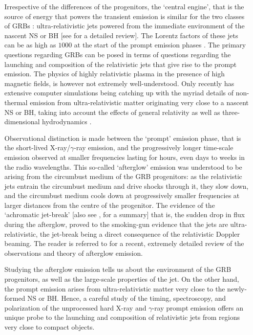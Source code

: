 Irrespective of the differences of the progenitors, the `central engine', that is the source of energy that powers the transient emission is similar for the two classes of GRBs \citep{Ghirlanda_et_al.-2009-A&A, Calderone_et_al.-2015-MNRAS}: ultra-relativistic jets powered from the immediate environment of the nascent NS or BH [see \cite{Kumar_and_Zhang-2015-PhR} for a detailed review]. The Lorentz factors of these jets can be as high as $1000$ at the start of the prompt emission phases \citep{Abdo_et_al.-2009-Science}. The primary questions regarding GRBs can be posed in terms of questions regarding the launching and composition of the relativistic jets that give rise to the prompt emission. The physics of highly relativistic plasma in the presence of high magnetic fields, is however not extremely well-understood. Only recently has extensive computer simulations being catching up with the myriad details of non-thermal emission from ultra-relativistic matter originating very close to a nascent NS or BH, taking into account the effects of general relativity as well as three-dimensional hydrodynamics \citep{Sasha_et_al.-2008-MNRAS, Sasha_et_Al.-2010-NewA, Narayan_et_al.-2011-MNRAS}.

Observational distinction is made between the `prompt' emission phase, that is the short-lived X-ray/$\gamma$-ray emission, and the progressively longer time-scale emission observed at smaller frequencies lasting for hours, even days to weeks in the radio wavelengths. This so-called `afterglow' emission was understood to be arising from the circumbust medium of the GRB progenitors: as the relativistic jets entrain the circumbust medium and drive shocks through it, they slow down, and the circumbust medium cools down at progressively smaller frequencies at larger distances from the centre of the progenitor. The evidence of the `achromatic jet-break' \citep{Fruchter_et_al.-1999-ApJ, Kulkarni_et_al.-1999-Nature, Stanek_et_al.-1999-ApJ, Harrison_et_al.-1999-ApJ, Frail_et_al.-2001-ApJ} [also see \cite{Fong_et_al.-2012-ApJ}, \cite{Fong_et_al.-2015-ApJ} for a summary] that is, the sudden drop in flux during the afterglow, proved to the smoking-gun evidence that the jets are ultra-relativistic, the jet-break being a direct consequence of the relativistic Doppler beaming. The reader is referred to \cite{Kumar_and_Zhang-2015-PhR} for a recent, extremely detailed review of the observations and theory of afterglow emission.

Studying the afterglow emission tells us about the environment of the GRB progenitors, as well as the large-scale properties of the jet. On the other hand, the prompt emission arises from ultra-relativistic matter very close to the newly-formed NS or BH. Hence, a careful study of the timing, spectroscopy, and polarization of the unprocessed hard X-ray and $\gamma$-ray prompt emission offers an unique probe to the launching and composition of relativistic jets from regions very close to compact objects.

